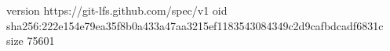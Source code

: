 version https://git-lfs.github.com/spec/v1
oid sha256:222e154e79ea35f8b0a433a47aa3215ef1183543084349c2d9cafbdcadf6831c
size 75601
